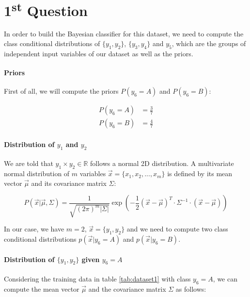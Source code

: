 \documentclass{article}
\begin{document}
\newpage

\section*{1\textsuperscript{st} Question}

In order to build the Bayesian classifier for this dataset, we need to compute the class conditional distributions of $\{y_1,y_2\}$, $\{y_3,y_4\}$ and $y_5$, which are the groups of independent input variables of our dataset as well as the priors.

\paragraph{Priors}

First of all, we will compute the priors $P(y_6=A)$ and $P(y_6=B)$:

\begin{align*}
  P(y_6=A) &= \frac{3}{7} \\
  P(y_6=B) &= \frac{4}{7} 
\end{align*}


\paragraph{Distribution of $y_1$ and $y_2$}

We are told that $y_1 \times y_2 \in \mathbb{R}$ follows a normal 2D distribution.
A multivariate normal distribution of $m$ variables $\vec{x} = \{x_1, x_2, ..., x_m\}$ is defined by its mean vector $\vec{\mu}$ and its covariance matrix $\Sigma$:

\[
  P(\vec{x}| \vec{\mu}, \Sigma) = \frac{1}{\sqrt{(2\pi)^m |\Sigma|}} \exp \left( -\frac{1}{2} (\vec{x} - \vec{\mu})^T \cdot \Sigma^{-1} \cdot (\vec{x} - \vec{\mu}) \right)
  \]

In our case, we have $m = 2$, $\vec{x} = \{y_1, y_2\}$ and we need to compute two class conditional distributions $p(\vec{x}|y_6=A)$ and $p(\vec{x}|y_6=B)$.

\paragraph{Distribution of $\{y_1,y_2\}$ given $y_6=A$}
\paragraph{}

Considering the training data in table \ref{tab:dataset1} with class $y_6=A$, we can compute the mean vector $\vec{\mu}$ and the covariance matrix $\Sigma$ as follows:
\end{document}
